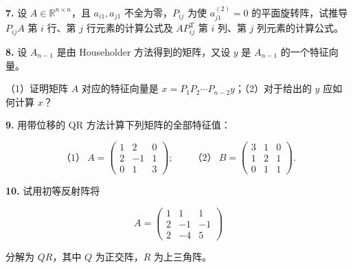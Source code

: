 \textbf{7.} 设 \(A\in\mathbb R^{n\times n}\)，且 \(a_{i1},a_{j1}\) 不全为零，\(P_{ij}\) 为使 \(a_{j1}^{(2)}=0\) 的平面旋转阵，试推导 \(P_{ij}A\) 第 \(i\) 行、第 \(j\) 行元素的计算公式及 \(AP_{ij}^{\mathrm T}\) 第 \(i\) 列、第 \(j\) 列元素的计算公式。

\textbf{8.} 设 \(A_{n-1}\) 是由 Householder 方法得到的矩阵，又设 \(y\) 是 \(A_{n-1}\) 的一个特征向量。

（1）证明矩阵 \(A\) 对应的特征向量是 \(x=P_1P_2\cdots P_{n-2}y\)；（2）对于给出的 \(y\) 应如何计算 \(x\)？

\textbf{9.} 用带位移的 QR 方法计算下列矩阵的全部特征值：

\[
\text{（1）}\ A=\begin{pmatrix}1&2&0\\2&-1&1\\0&1&3\end{pmatrix};\qquad
\text{（2）}\ B=\begin{pmatrix}3&1&0\\1&2&1\\0&1&1\end{pmatrix}.
\]

\textbf{10.} 试用初等反射阵将

\[
A=\begin{pmatrix}1&1&1\\2&-1&-1\\2&-4&5\end{pmatrix}
\]

分解为 \(QR\)，其中 \(Q\) 为正交阵，\(R\) 为上三角阵。

